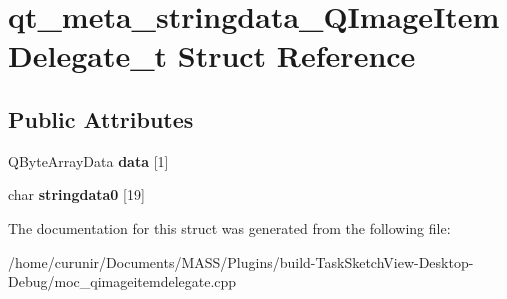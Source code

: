 \hypertarget{structqt__meta__stringdata___q_image_item_delegate__t}{}\section{qt\+\_\+meta\+\_\+stringdata\+\_\+\+Q\+Image\+Item\+Delegate\+\_\+t Struct Reference}
\label{structqt__meta__stringdata___q_image_item_delegate__t}
\subsection*{Public Attributes}
\begin{DoxyCompactItemize}
\item 
Q\+Byte\+Array\+Data {\bfseries data} \mbox{[}1\mbox{]}\hypertarget{structqt__meta__stringdata___q_image_item_delegate__t_a742dfb00878456e01484f4e681b91eeb}{}\label{structqt__meta__stringdata___q_image_item_delegate__t_a742dfb00878456e01484f4e681b91eeb}

\item 
char {\bfseries stringdata0} \mbox{[}19\mbox{]}\hypertarget{structqt__meta__stringdata___q_image_item_delegate__t_a7b39ce9c1bfdb5a835a2ba9fd587a975}{}\label{structqt__meta__stringdata___q_image_item_delegate__t_a7b39ce9c1bfdb5a835a2ba9fd587a975}

\end{DoxyCompactItemize}


The documentation for this struct was generated from the following file\+:\begin{DoxyCompactItemize}
\item 
/home/curunir/\+Documents/\+M\+A\+S\+S/\+Plugins/build-\/\+Task\+Sketch\+View-\/\+Desktop-\/\+Debug/moc\+\_\+qimageitemdelegate.\+cpp\end{DoxyCompactItemize}
